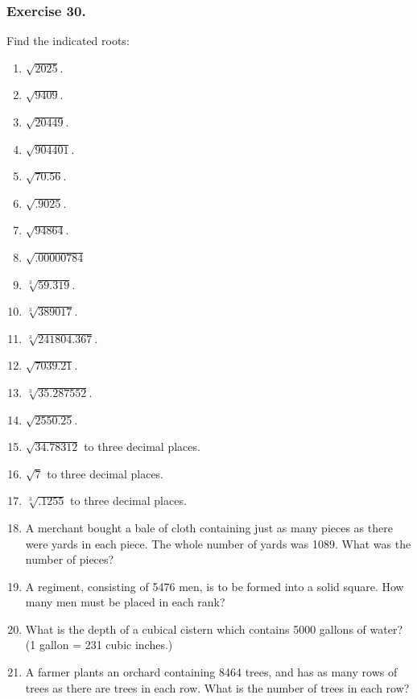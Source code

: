 \documentclass{book}
\begin{document}
\subsubsection*{Exercise 30.}

Find the indicated roots:
\begin{enumerate}
\item $\sqrt{2025}$.

\item $\sqrt{9409}$.

\item $\sqrt{20449}$.

\item $\sqrt{904401}$.

\item $\sqrt{70.56}$.

\item $\sqrt{.9025}$.

\item $\sqrt{94864}$.

\item $\sqrt{.00000784}$

\item $\sqrt[3]{59.319}$.

\item $\sqrt[3]{389017}$.

\item $\sqrt[3]{241804.367}$.

\item $\sqrt{7039.21}$.

\item $\sqrt[3]{35.287552}$.

\item  $\sqrt{2550.25}$.

\item $\sqrt{34.78312}$ to three decimal places.

\item $\sqrt{7}$ to three decimal places.

\item $\sqrt[3]{.1255}$ to three decimal places.

\item A merchant bought a bale of cloth containing just as many
pieces as there were yards in each piece. The whole number of
yards was 1089. What was the number of pieces?

\item A regiment, consisting of 5476 men, is to be formed into a
solid square. How many men must be placed in each rank?

\item What is the depth of a cubical cistern which contains 5000
gallons of water? (1 gallon = 231 cubic inches.)

\item A farmer plants an orchard containing 8464 trees, and has as
many rows of trees as there are trees in each row. What is the
number of trees in each row?
\end{enumerate}
\end{document}
